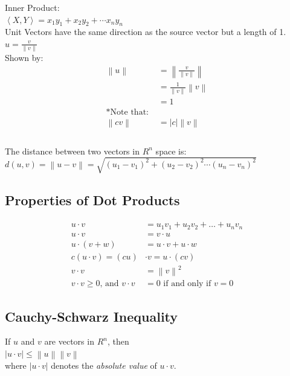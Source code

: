 \documentclass[]{article}
\begin{document}
Inner Product: \\
$\left\langle X,Y\right\rangle = x_1y_1 + x_2y_2 + \cdots x_ny_n$ \\

Unit Vectors have the same direction as the source vector but a length of 1. \\
$ u = \frac{v}{\left\|v\right\| } $ \\
Shown by: \\
\begin{align*}	
	\left\| u\right\| &= \left\|\frac{v}{\left\|v\right\|}\right\|  \\
		&= \frac{1}{\left\|v\right\|}\left\|v\right\| \\
		&= 1 \\
	\text{*Note that: } \\
	\left\|cv\right\| &= |c|\left\|v\right\|  \\
\end{align*} \\

The distance between two vectors in $R^n$ space is:
$ d(u,v) = 
\left\| u-v \right\| = 
\sqrt{(u_1-v_1)^2 + (u_2-v_2)^2 \cdots (u_n-v_n)^2} $\\

\subsection{Properties of Dot Products}
\begin{align*}
	u \cdot v &= u_1v_1 + u_2v_2 + \ldots + u_nv_n \\
	u \cdot v &= v \cdot u \\
	u \cdot (v + w) &= u \cdot v + u \cdot w \\
	c(u \cdot v) = (cu) &\cdot v = u \cdot (cv) \\
	v \cdot v &= \left\|v\right\|^2 \\
	v \cdot v \geq 0 \text{, and } v \cdot v &= 0 \text{ if and only if } v = 0
\end{align*}

\subsection{Cauchy-Schwarz Inequality}
If $u$ and $v$ are vectors in $R^n$, then \\
$\left|u \cdot v\right| \leq \left\|u\right\| \left\|v\right\|$ \\
where $\left|u \cdot v\right|$ 
denotes the \emph{absolute value} of $u \cdot v$.
\\
\end{document}
